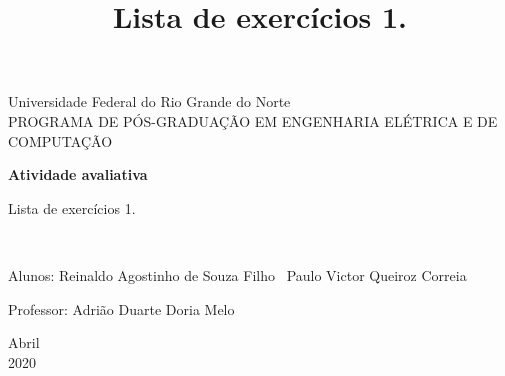 \documentclass[a4paper, 12pt]{article}
\begin{document}
\begin{titlepage}
	\begin{center}
	

		\Huge{Universidade Federal do Rio Grande do Norte}\\
		\large{PROGRAMA DE PÓS-GRADUAÇÃO EM ENGENHARIA ELÉTRICA E DE COMPUTAÇÃO }\\ 
\vspace{15pt}
        
        \vspace{85pt}
        
		\textbf{\LARGE{Atividade avaliativa}}
		\title{\large{Lista de exercícios 1.}}
			
	\end{center}
\vspace{1,5cm}
	
	\begin{flushright}

   \begin{list}{}{
      \setlength{\leftmargin}{4.5cm}
      \setlength{\rightmargin}{0cm}
      \setlength{\labelwidth}{0pt}
      \setlength{\labelsep}{\leftmargin}}

      \item \large{Lista de exercícios 1.}

      \begin{list}{}{
      \setlength{\leftmargin}{0cm}
      \setlength{\rightmargin}{0cm}
      \setlength{\labelwidth}{0pt}
      \setlength{\labelsep}{\leftmargin}}
      \

			\item Alunos: 
			    \subitem Reinaldo Agostinho de Souza Filho \
			    \subitem Paulo Victor Queiroz Correia 
            \item Professor: Adrião Duarte Doria Melo \

      \end{list}
   \end{list}
\end{flushright}
\vspace{1cm}
\begin{center}
		\vspace{\fill}
		 Abril\\
		 2020
			\end{center}
\end{titlepage}
\newpage
\newpage
\tableofcontents
\end{document}
